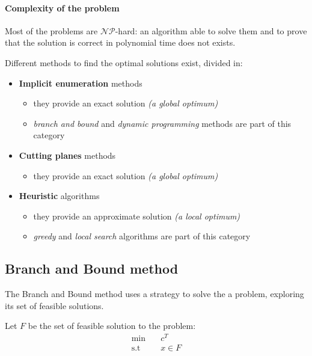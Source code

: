 \documentclass[english]{article}
\begin{document}
\paragraph{Complexity of the \ILP problem}

Most of the \ILP problems are \(\mathcal{NP}\)-hard:
an algorithm able to solve them and to prove that the solution is correct in polynomial time does not exists.

Different methods to find the optimal solutions exist, divided in:

\begin{itemize}
  \item \textbf{Implicit enumeration} methods
        \begin{itemize}
          \item[\cmarkthin] they provide an exact solution \textit{(a global optimum)}
          \item \textit{branch and bound} and \textit{dynamic programming} methods are part of this category
        \end{itemize}
  \item \textbf{Cutting planes} methods
        \begin{itemize}
          \item[\cmarkthin] they provide an exact solution \textit{(a global optimum)}
        \end{itemize}
  \item \textbf{Heuristic} algorithms
        \begin{itemize}
          \item[\xmarkthin] they provide an approximate solution \textit{(a local optimum)}
          \item \textit{greedy} and \textit{local search} algorithms are part of this category
        \end{itemize}
\end{itemize}

\subsection{Branch and Bound method}

The Branch and Bound method uses a  strategy to solve the a \ILP problem, exploring its set of feasible solutions.

Let \(F\) be the set of feasible solution to the problem:
\begin{align*}
  \min       \quad & c^T     \\
  \text{s.t} \quad & x \in F \\
\end{align*}
\end{document}
